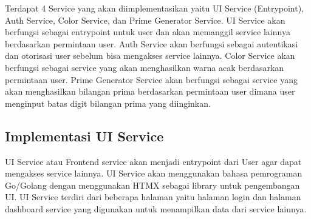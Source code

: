 Terdapat 4 Service yang akan diimplementasikan yaitu UI Service (Entrypoint),
Auth Service, Color Service, dan Prime Generator Service. UI Service akan
berfungsi sebagai entrypoint untuk user dan akan memanggil service lainnya
berdasarkan permintaan user. Auth Service akan berfungsi sebagai autentikasi
dan otorisasi user sebelum bisa mengakses service lainnya. Color Service akan
berfungsi sebagai service yang akan menghasilkan warna acak berdasarkan
permintaan user. Prime Generator Service akan berfungsi sebagai service yang
akan menghasilkan bilangan prima berdasarkan permintaan user dimana user
menginput batas digit bilangan prima yang diinginkan.

\subsection{Implementasi UI Service}
UI Service atau Frontend service akan menjadi entrypoint dari User agar dapat
mengakses service lainnya. UI Service akan menggunakan bahasa pemrograman
Go/Golang dengan menggunakan HTMX sebagai library untuk pengembangan UI. UI
Service terdiri dari beberapa halaman yaitu halaman login dan halaman dashboard
service yang digunakan untuk menampilkan data dari service lainnya.

